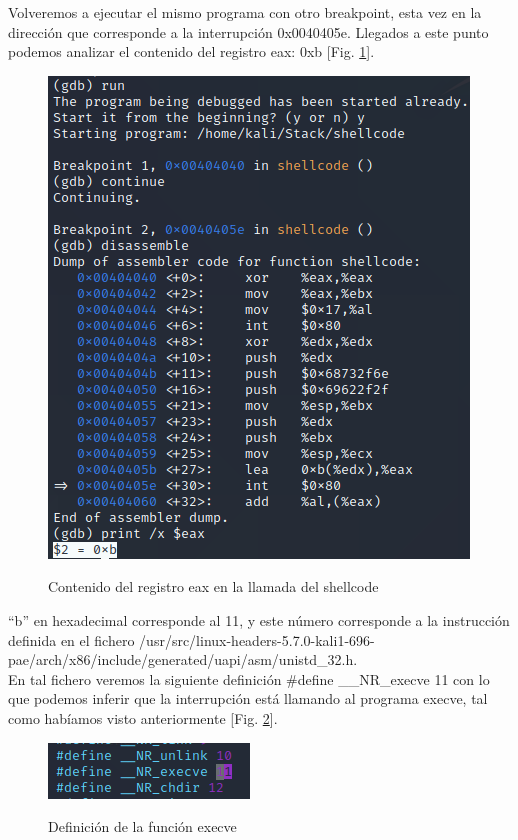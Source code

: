 \documentclass[a4paper,oneside]{article}
\begin{document}
Volveremos a ejecutar el mismo programa con otro breakpoint, esta vez en la dirección que corresponde a la interrupción 0x0040405e. Llegados a este punto podemos analizar el contenido del registro eax: 0xb [Fig. \ref{fig:disassemble2}]. 

\begin{figure}[h!]
  \centering
  \includegraphics[scale=0.5]{images/disassemble2.png}\\
  \caption{Contenido del registro eax en la llamada del shellcode}
  \label{fig:disassemble2}
\end{figure}

``b'' en hexadecimal corresponde al 11, y este número corresponde a la instrucción definida en el fichero /usr/src/linux-headers-5.7.0-kali1-696-pae/arch/x86/include/generated/uapi/asm/unistd\_32.h.\\

En tal fichero veremos la siguiente definición \#define \_\_NR\_execve 11 con lo que podemos inferir que la interrupción está llamando al programa execve, tal como habíamos visto anteriormente [Fig. \ref{fig:execve}].

\begin{figure}[h!]
  \centering
  \includegraphics[scale=0.5]{images/execve.png}\\
  \caption{Definición de la función execve}
  \label{fig:execve}
\end{figure}
\end{document}
